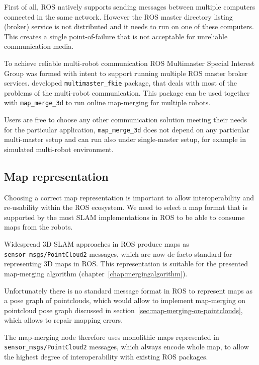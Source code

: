 First of all, \gls{ROS} natively supports sending messages between multiple computers connected in the same network. However the \gls{ROS} master directory listing (broker) service is not distributed and it needs to run on one of these computers. This creates a single point-of-failure that is not acceptable for unreliable communication media.

To achieve reliable multi-robot communication \gls{ROS} Multimaster Special Interest Group was formed with intent to support running multiple \gls{ROS} master broker services. \citet{hernadez2015multi} developed \texttt{multimaster\_fkie} package, that deals with most of the problems of the multi-robot communication. This package can be used together with \texttt{map\_merge\_3d} to run online map-merging for multiple robots.

Users are free to choose any other communication solution meeting their needs for the particular application, \texttt{map\_merge\_3d} does not depend on any particular multi-master setup and can run also under single-master setup, for example in simulated multi-robot environment.

\subsection{Map representation}
\label{sec:map-representation}

Choosing a correct map representation is important to allow interoperability and re-usability within the \gls{ROS} ecosystem. We need to select a map format that is supported by the most \gls{SLAM} implementations in \gls{ROS} to be able to consume maps from the robots.

Widespread \gls{3D} \gls{SLAM} approaches in \gls{ROS} produce maps as \texttt{sen\-sor\_msgs/\-Point\-Cloud2} messages, which are now de-facto standard for representing \gls{3D} maps in \gls{ROS}. This representation is suitable for the presented map-merging algorithm (chapter~\ref{chap:mergingalgorithm}).

Unfortunately there is no standard message format in \gls{ROS} to represent maps as a pose graph of pointclouds, which would allow to implement map-merging on pointcloud pose graph discussed in section~\ref{sec:map-merging-on-pointclouds}, which allows to repair mapping errors.

The map-merging node therefore uses monolithic maps represented in \texttt{sen\-sor\_msgs/\-Point\-Cloud2} messages, which always encode whole map, to allow the highest degree of interoperability with existing \gls{ROS} packages.

